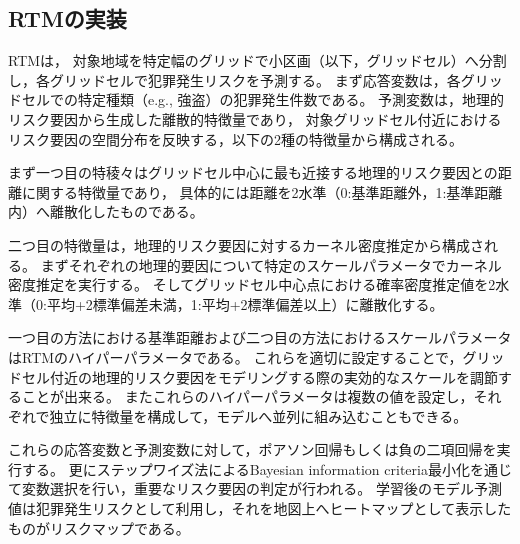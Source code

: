 \subsection{RTMの実装}
\label{conv_imp:sec}
RTM\cite{caplan2015risk}は，
対象地域を特定幅のグリッドで小区画（以下，グリッドセル）へ分割し，各グリッドセルで犯罪発生リスクを予測する。
まず応答変数は，各グリッドセルでの特定種類（e.g., 強盗）の犯罪発生件数である。
予測変数は，地理的リスク要因から生成した離散的特徴量であり，
対象グリッドセル付近におけるリスク要因の空間分布を反映する，以下の2種の特徴量から構成される。

まず一つ目の特稜々はグリッドセル中心に最も近接する地理的リスク要因との距離に関する特徴量であり，
具体的には距離を2水準（0:基準距離外，1:基準距離内）へ離散化したものである。

二つ目の特徴量は，地理的リスク要因に対するカーネル密度推定から構成される。
まずそれぞれの地理的要因について特定のスケールパラメータでカーネル密度推定を実行する\cite{bishop}。
そしてグリッドセル中心点における確率密度推定値を2水準（0:平均+2標準偏差未満，1:平均+2標準偏差以上）に離散化する。

一つ目の方法における基準距離および二つ目の方法におけるスケールパラメータはRTMのハイパーパラメータである。
これらを適切に設定することで，グリッドセル付近の地理的リスク要因をモデリングする際の実効的なスケールを調節することが出来る。
またこれらのハイパーパラメータは複数の値を設定し，それぞれで独立に特徴量を構成して，モデルへ並列に組み込むこともできる。

これらの応答変数と予測変数に対して，ポアソン回帰\cite{poisson}もしくは負の二項回帰\cite{Hilbe_2011}を実行する。
更にステップワイズ法\cite{islp}によるBayesian information criteria最小化を通じて変数選択を行い，重要なリスク要因の判定が行われる。
学習後のモデル予測値は犯罪発生リスクとして利用し，それを地図上へヒートマップとして表示したものがリスクマップである。

 
 

